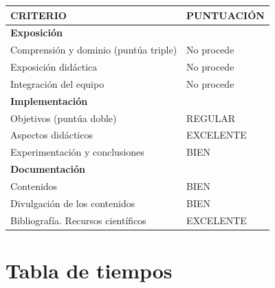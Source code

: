 \documentclass[a4paper]{article}
\begin{document}
\begin{table}[h!]
	\centering
	\begin{tabular}{|l|l|}
		\hline
		\textbf{CRITERIO} & \textbf{PUNTUACIÓN} \\ \hline
		
		\multicolumn{2}{|l|}{\textbf{Exposición}} \\ \hline
		Comprensión y dominio (puntúa triple) & No procede \\ \hline
		Exposición didáctica & No procede \\ \hline
		Integración del equipo & No procede \\ \hline
		
		\multicolumn{2}{|l|}{\textbf{Implementación}} \\ \hline
		Objetivos (puntúa doble) & REGULAR \\ \hline
		Aspectos didácticos & EXCELENTE \\ \hline
		Experimentación y conclusiones & BIEN \\ \hline
		
		\multicolumn{2}{|l|}{\textbf{Documentación}} \\ \hline
		Contenidos & BIEN \\ \hline
		Divulgación de los contenidos & BIEN \\ \hline
		Bibliografía. Recursos científicos & EXCELENTE \\ \hline
		
	\end{tabular}
\end{table}

\section{Tabla de tiempos}
\end{document}
